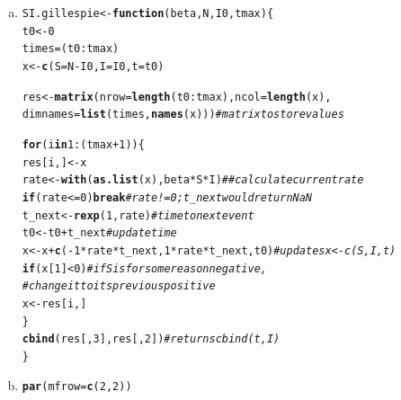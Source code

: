 \documentclass[12pt]{article}\usepackage[]{graphicx}\usepackage[]{color}
\makeatletter
\newcommand{\hlnum}[1]{\textcolor[rgb]{0.686,0.059,0.569}{#1}}%
\newcommand{\hlcom}[1]{\textcolor[rgb]{0.678,0.584,0.686}{\textit{#1}}}%
\newcommand{\hlopt}[1]{\textcolor[rgb]{0,0,0}{#1}}%
\newcommand{\hlstd}[1]{\textcolor[rgb]{0.345,0.345,0.345}{#1}}%
\newcommand{\hlkwa}[1]{\textcolor[rgb]{0.161,0.373,0.58}{\textbf{#1}}}%
\newcommand{\hlkwb}[1]{\textcolor[rgb]{0.69,0.353,0.396}{#1}}%
\newcommand{\hlkwc}[1]{\textcolor[rgb]{0.333,0.667,0.333}{#1}}%
\newcommand{\hlkwd}[1]{\textcolor[rgb]{0.737,0.353,0.396}{\textbf{#1}}}%
\newenvironment{kframe}{%
 \def\at@end@of@kframe{}%
 \ifinner\ifhmode%
  \def\at@end@of@kframe{\end{minipage}}%
  \begin{minipage}{\columnwidth}%
 \fi\fi%
 \def\FrameCommand##1{\hskip\@totalleftmargin \hskip-\fboxsep
 \colorbox{shadecolor}{##1}\hskip-\fboxsep
     \hskip-\linewidth \hskip-\@totalleftmargin \hskip\columnwidth}%
 \MakeFramed {\advance\hsize-\width
   \@totalleftmargin\z@ \linewidth\hsize
   \@setminipage}}%
 {\par\unskip\endMakeFramed%
 \at@end@of@kframe}
\newenvironment{knitrout}{}{} %
\makeatother
\begin{document}
\begin{enumerate}[(a)]

\item

\begin{knitrout}
\color{fgcolor}\begin{kframe}
\begin{alltt}
\hlstd{SI.gillespie} \hlkwb{<-} \hlkwa{function}\hlstd{(}\hlkwc{beta}\hlstd{,} \hlkwc{N}\hlstd{,} \hlkwc{I0}\hlstd{,} \hlkwc{tmax}\hlstd{)\{}
  \hlstd{t0} \hlkwb{<-} \hlnum{0}
  \hlstd{times} \hlkwb{=}\hlstd{(t0}\hlopt{:}\hlstd{tmax)}
  \hlstd{x} \hlkwb{<-}\hlkwd{c}\hlstd{(}\hlkwc{S}\hlstd{=N}\hlopt{-}\hlstd{I0,} \hlkwc{I}\hlstd{=I0,} \hlkwc{t}\hlstd{=t0)}

  \hlstd{res} \hlkwb{<-} \hlkwd{matrix}\hlstd{(}\hlkwc{nrow}\hlstd{=}\hlkwd{length}\hlstd{(t0}\hlopt{:}\hlstd{tmax),}\hlkwc{ncol}\hlstd{=}\hlkwd{length}\hlstd{(x),}
                \hlkwc{dimnames} \hlstd{=} \hlkwd{list}\hlstd{(times,}\hlkwd{names}\hlstd{(x)))} \hlcom{#matrix to store values}

  \hlkwa{for} \hlstd{(i} \hlkwa{in} \hlnum{1}\hlopt{:}\hlstd{(tmax}\hlopt{+}\hlnum{1}\hlstd{))\{}
    \hlstd{res[i,]} \hlkwb{<-} \hlstd{x}
    \hlstd{rate} \hlkwb{<-} \hlkwd{with}\hlstd{(}\hlkwd{as.list}\hlstd{(x), beta}\hlopt{*}\hlstd{S}\hlopt{*}\hlstd{I)} \hlcom{## calculate current rate}
    \hlkwa{if}\hlstd{(rate}\hlopt{<=}\hlnum{0}\hlstd{)} \hlkwa{break} \hlcom{#rate != 0; t_next would return NaN}
    \hlstd{t_next} \hlkwb{<-} \hlkwd{rexp}\hlstd{(}\hlnum{1}\hlstd{,rate)}  \hlcom{#time to next event}
    \hlstd{t0} \hlkwb{<-} \hlstd{t0} \hlopt{+} \hlstd{t_next} \hlcom{# update time}
    \hlstd{x} \hlkwb{<-} \hlstd{x}\hlopt{+}\hlkwd{c}\hlstd{(}\hlopt{-}\hlnum{1}\hlopt{*}\hlstd{rate}\hlopt{*}\hlstd{t_next,} \hlnum{1}\hlopt{*}\hlstd{rate}\hlopt{*}\hlstd{t_next, t0)} \hlcom{#updates x <- c(S, I, t)}
    \hlkwa{if}\hlstd{(x[}\hlnum{1}\hlstd{]}\hlopt{<}\hlnum{0}\hlstd{)} \hlcom{#if S is for some reason negative, }
      \hlcom{#change it to its previous positive}
      \hlstd{x} \hlkwb{<-} \hlstd{res[i,]}
  \hlstd{\}}
  \hlkwd{cbind}\hlstd{(res[,}\hlnum{3}\hlstd{],res[,}\hlnum{2}\hlstd{])} \hlcom{#returns cbind(t, I)}
\hlstd{\}}
\end{alltt}
\end{kframe}
\end{knitrout}


\item 

\begin{knitrout}
\color{fgcolor}\begin{kframe}
\begin{alltt}
\hlkwd{par}\hlstd{(}\hlkwc{mfrow} \hlstd{=} \hlkwd{c}\hlstd{(}\hlnum{2}\hlstd{,}\hlnum{2}\hlstd{))}


\end{alltt}
\end{kframe}
\end{knitrout}
\end{enumerate}
\end{document}
